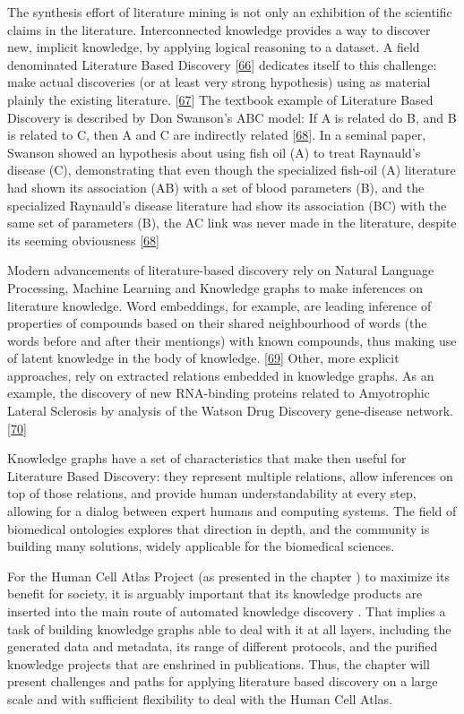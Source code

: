 The synthesis effort of literature mining is not only an exhibition of the scientific claims in the literature.
Interconnected knowledge provides a way to discover new, implicit knowledge, by applying logical reasoning to a dataset.
A field denominated Literature Based Discovery {[}\protect\hyperlink{ref-jXryyPLB}{66}{]} dedicates itself to this challenge: make actual discoveries (or at least very strong hypothesis) using as material plainly the existing literature. {[}\protect\hyperlink{ref-Fuf8oc85}{67}{]}
The textbook example of Literature Based Discovery is described by Don Swanson's ABC model: If A is related do B, and B is related to C, then A and C are indirectly related {[}\protect\hyperlink{ref-LNtevqb9}{68}{]}.
In a seminal paper, Swanson showed an hypothesis about using fish oil (A) to treat Raynauld's disease (C), demonstrating that even though the specialized fish-oil (A) literature had shown its association (AB) with a set of blood parameters (B), and the specialized Raynauld's disease literature had show its association (BC) with the same set of parameters (B), the AC link was never made in the literature, despite its seeming obviousness {[}\protect\hyperlink{ref-LNtevqb9}{68}{]}

Modern advancements of literature-based discovery rely on Natural Language Processing, Machine Learning and Knowledge graphs to make inferences on literature knowledge.
Word embeddings, for example, are leading inference of properties of compounds based on their shared neighbourhood of words (the words before and after their mentiongs) with known compounds, thus making use of latent knowledge in the body of knowledge. {[}\protect\hyperlink{ref-Lbqx9XBK}{69}{]}
Other, more explicit approaches, rely on extracted relations embedded in knowledge graphs. As an example, the discovery of new RNA-binding proteins related to Amyotrophic Lateral Sclerosis by analysis of the Watson Drug Discovery gene-disease network. {[}\protect\hyperlink{ref-CovO24JR}{70}{]}

Knowledge graphs have a set of characteristics that make then useful for Literature Based Discovery: they represent multiple relations, allow inferences on top of those relations, and provide human understandability at every step, allowing for a dialog between expert humans and computing systems.
The field of biomedical ontologies explores that direction in depth, and the community is building many solutions, widely applicable for the biomedical sciences.

For the Human Cell Atlas Project (as presented in the chapter ) to maximize its benefit for society, it is arguably important that its knowledge products are inserted into the main route of automated knowledge discovery .
That implies a task of building knowledge graphs able to deal with it at all layers, including the generated data and metadata, its range of different protocols, and the purified knowledge projects that are enshrined in publications.
Thus, the chapter will present challenges and paths for applying literature based discovery on a large scale and with sufficient flexibility to deal with the Human Cell Atlas.

